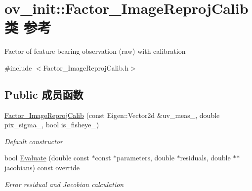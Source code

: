 \hypertarget{classov__init_1_1Factor__ImageReprojCalib}{}\section{ov\+\_\+init\+:\+:Factor\+\_\+\+Image\+Reproj\+Calib类 参考}
\label{classov__init_1_1Factor__ImageReprojCalib}


Factor of feature bearing observation (raw) with calibration  




{\ttfamily \#include $<$Factor\+\_\+\+Image\+Reproj\+Calib.\+h$>$}

\subsection*{Public 成员函数}
\begin{DoxyCompactItemize}
\item 
\hyperlink{classov__init_1_1Factor__ImageReprojCalib_aaecdb048ff86ec1621fc690adf6eb89a}{Factor\+\_\+\+Image\+Reproj\+Calib} (const Eigen\+::\+Vector2d \&uv\+\_\+meas\+\_\+, double pix\+\_\+sigma\+\_\+, bool is\+\_\+fisheye\+\_\+)
\begin{DoxyCompactList}\small\item\em Default constructor \end{DoxyCompactList}\item 
bool \hyperlink{classov__init_1_1Factor__ImageReprojCalib_ad374255563922f2dff0e8d33f860419b}{Evaluate} (double const $\ast$const $\ast$parameters, double $\ast$residuals, double $\ast$$\ast$jacobians) const override
\begin{DoxyCompactList}\small\item\em Error residual and Jacobian calculation \end{DoxyCompactList}\end{DoxyCompactItemize}
